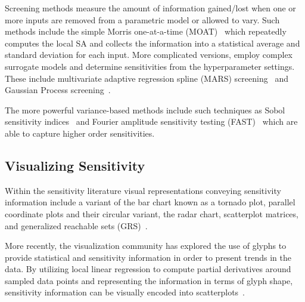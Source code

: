 Screening methods measure the amount of information gained/lost when one or more inputs are removed from a parametric model or allowed to vary.
%
Such methods include the simple Morris one-at-a-time (MOAT)~\cite{Morris1991} which repeatedly computes the local SA and collects the information into a statistical average and standard deviation for each input.
%
More complicated versions, employ complex surrogate models and determine sensitivities from the hyperparameter settings.
%
These include multivariate adaptive regression spline (MARS) screening~\cite{Friedman1991} and Gaussian Process screening~\cite{RasmussenWilliams2006}.

The more powerful variance-based methods include such techniques as Sobol sensitivity indices~\cite{Sobol1993} and Fourier amplitude sensitivity testing (FAST)~\cite{CukierFortuinShuler1973} which are able to capture higher order sensitivities.

\subsection{Visualizing Sensitivity}
\label{sec:SA_visualization}
Within the sensitivity literature visual representations conveying sensitivity information include a variant of the bar chart known as a tornado plot, parallel coordinate plots and their circular variant, the radar chart, scatterplot matrices,  and generalized reachable sets (GRS)~\cite{SaltelliChanScott2000,BushenkovChernykhKamenev1995}.

More recently, the visualization community has explored the use of glyphs to provide statistical and sensitivity information in order to present trends in the data.
%
By utilizing local linear regression to compute partial derivatives around sampled data points and representing the information in terms of glyph shape, sensitivity information can be visually encoded into scatterplots~\cite{CorreaChanMa2009,ChanCorreaMa2010,GuoWardRundensteiner2011,ChanCorreaMa2013}.


